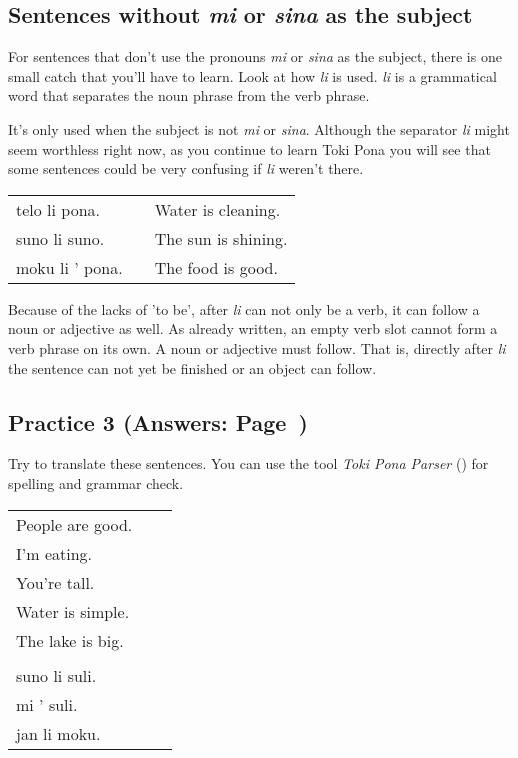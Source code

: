 \subsection*{Sentences without \textit{mi} or \textit{sina} as the subject}
%
For sentences that don't use the pronouns \textit{mi} or \textit{sina} as the subject, there is one small catch that you'll have to learn. 
Look at how \textit{li} is used. 
\textit{\textit{li}} is a grammatical word that separates the noun phrase from the verb phrase. 


It's only used when the subject is not \textit{mi} or \textit{sina}. 
Although the separator \textit{li} might seem worthless right now, as you continue to learn Toki Pona you will see that some sentences could be very confusing if \textit{li} weren't there. 

\begin{supertabular}{p{5cm}|ll}
telo li pona. && Water is cleaning. \\
suno li suno. && The sun is shining. \\
moku li ' pona. && The food is good. \\ 
\end{supertabular} 

Because of the lacks of 'to be', after \textit{li} can not only be a verb, it can follow a noun or adjective as well. 
As already written, an empty verb slot cannot form a verb phrase on its own. 
A noun or adjective must follow. 
That is, directly after \textit{li} the sentence can not yet be finished or an object can follow.
%
\newpage
\subsection*{Practice 3 (Answers: Page~\pageref{'basic_sentences'})}
%
Try to translate these sentences. 
You can use the tool \textit{Toki Pona Parser} (\cite{www:rowa:02}) for spelling and grammar check. 

\begin{supertabular}{p{5cm}|ll}
People are good. && \\ %
I'm eating. &&  \\ %
You're tall. &&  \\ %
Water is simple. &&  \\ %
The lake is big. &&\\ %
 && \\
suno li suli. &&  \\%
mi ' suli. &&  \\%
jan li moku. &&  \\%
\end{supertabular} \\%
%
